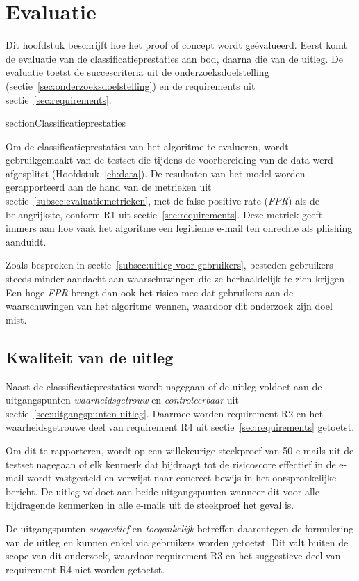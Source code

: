 \chapter{Evaluatie}%
\label{ch:evaluatie}

Dit hoofdstuk beschrijft hoe het proof of concept wordt geëvalueerd. Eerst komt de evaluatie van de classificatieprestaties aan bod, daarna die van de uitleg. De evaluatie toetst de succescriteria uit de onderzoeksdoelstelling (sectie~\ref{sec:onderzoeksdoelstelling}) en de requirements uit sectie~\ref{sec:requirements}.

section{Classificatieprestaties}%
\label{sec:evaluatie-classificatie}

Om de classificatieprestaties van het algoritme te evalueren, wordt gebruikgemaakt van de testset die tijdens de voorbereiding van de data werd afgesplitst (Hoofdstuk~\ref{ch:data}). De resultaten van het model worden gerapporteerd aan de hand van de metrieken uit sectie~\ref{subsec:evaluatiemetrieken}, met de false-positive-rate (\emph{FPR}) als de belangrijkste, conform R1 uit sectie~\ref{sec:requirements}. Deze metriek geeft immers aan hoe vaak het algoritme een legitieme e-mail ten onrechte als phishing aanduidt.

Zoals besproken in sectie~\ref{subsec:uitleg-voor-gebruikers}, besteden gebruikers steeds minder aandacht aan waarschuwingen die ze herhaaldelijk te zien krijgen \autocite{Anderson2015}. Een hoge \emph{FPR} brengt dan ook het risico mee dat gebruikers aan de waarschuwingen van het algoritme wennen, waardoor dit onderzoek zijn doel mist.

\section{Kwaliteit van de uitleg}%
\label{sec:evaluatie-uitleg}

Naast de classificatieprestaties wordt nagegaan of de uitleg voldoet aan de uitgangspunten \emph{waarheidsgetrouw} en \emph{controleerbaar} uit sectie~\ref{sec:uitgangspunten-uitleg}. Daarmee worden requirement R2 en het waarheidsgetrouwe deel van requirement R4 uit sectie~\ref{sec:requirements} getoetst.

Om dit te rapporteren, wordt op een willekeurige steekproef van 50 e-mails uit de testset nagegaan of elk kenmerk dat bijdraagt tot de risicoscore effectief in de e-mail wordt vastgesteld en verwijst naar concreet bewijs in het oorspronkelijke bericht. De uitleg voldoet aan beide uitgangspunten wanneer dit voor alle bijdragende kenmerken in alle e-mails uit de steekproef het geval is.

De uitgangspunten \emph{suggestief} en \emph{toegankelijk} betreffen daarentegen de formulering van de uitleg en kunnen enkel via gebruikers worden getoetst. Dit valt buiten de scope van dit onderzoek, waardoor requirement R3 en het suggestieve deel van requirement R4 niet worden getoetst.